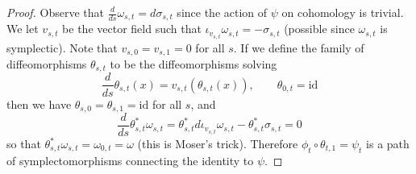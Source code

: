 \documentclass{article}
\begin{document}
\begin{proof}
  Observe that $\frac{d}{ds}\omega_{s,t}=d\sigma_{s,t}$ since the action of $\psi$ on cohomology is trivial. We let $v_{s,t}$ be the vector field such that $\iota_{v_{s,t}}\omega_{s,t}=-\sigma_{s,t}$ (possible since $\omega_{s,t}$ is symplectic). Note that $v_{s,0}=v_{s,1}=0$ for all $s$. If we define the family of diffeomorphisms $\theta_{s,t}$ to be the diffeomorphisms solving
  \[\frac{d}{ds}\theta_{s,t}(x)=v_{s,t}(\theta_{s,t}(x)),\qquad\theta_{0,t}=\mathrm{id}\]
  then we have $\theta_{s,0}=\theta_{s,1}=\mathrm{id}$ for all $s$, and
  \[\frac{d}{ds}\theta_{s,t}^*\omega_{s,t}=\theta_{s,t}^*d\iota_{v_{s,t}}\omega_{s,t}-\theta_{s,t}^*\sigma_{s,t}=0\]
  so that $\theta_{s,t}^*\omega_{s,t}=\omega_{0,t}=\omega$ (this is Moser's trick). Therefore $\phi_t\circ\theta_{t,1}=\psi_t$ is a path of symplectomorphisms connecting the identity to $\psi$.
\end{proof}
\end{document}
